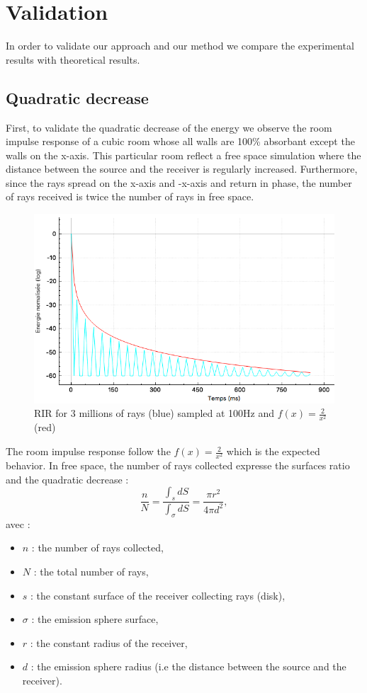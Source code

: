 \documentclass[AMA,STIX1COL]{WileyNJD-v2}
\begin{document}
\section{Validation}\label{sec5}

In order to validate our approach and our method we compare the experimental results with theoretical results. 

\subsection{Quadratic decrease}
First, to validate the quadratic decrease of the energy we observe the room impulse response of a cubic room whose all walls are 100\% absorbant except the walls on the x-axis. This particular room reflect a free space simulation where the distance between the source and the receiver is regularly increased. Furthermore, since the rays spread on the x-axis and -x-axis and return in phase, the number of rays received is twice the number of rays in free space.
%
\begin{figure}
\centering
	\includegraphics[width=0.6\linewidth]{test1}
	\caption{RIR for 3 millions of rays (blue) sampled at 100Hz and $f(x)=\frac{2}{x^2}$ (red)}
	\label{test1}
\end{figure}
%
The room impulse response follow the $f(x)=\frac{2}{x^2}$ which is the expected behavior. In free space, the number of rays collected expresse the surfaces ratio and the quadratic decrease :
\begin{equation}
\frac{n}{N} = \frac{\int_s dS}{\int_{\sigma} dS} = \frac{\pi r^2}{4\pi d^2},
\end{equation}
avec :
\begin{itemize}
\item$n$ : the number of rays collected,
\item$N$ : the total number of rays,
\item$s$ : the constant surface of the receiver collecting rays (disk),
\item$\sigma$ : the emission sphere surface,
\item$r$ : the constant radius of the receiver,
\item$d$ : the emission sphere radius (i.e the distance between the source and the receiver).
\end{itemize}
\end{document}
